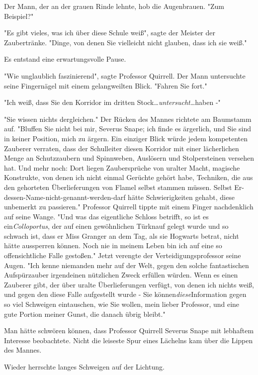{Der Mann, der an der grauen Rinde lehnte, hob die Augenbrauen. "Zum Beispiel?"

"Es gibt vieles, was ich über diese Schule weiß", sagte der Meister der Zaubertränke. "Dinge, von denen Sie vielleicht nicht glauben, dass ich sie weiß."

Es entstand eine erwartungsvolle Pause.

"Wie unglaublich faszinierend", sagte Professor Quirrell. Der Mann untersuchte seine Fingernägel mit einem gelangweilten Blick. "Fahren Sie fort."

"Ich weiß, dass Sie den Korridor im dritten Stock…\emph{untersucht…}haben -"

"Sie wissen nichts dergleichen." Der Rücken des Mannes richtete am Baumstamm auf. "Bluffen Sie nicht bei mir, Severus Snape; ich finde es ärgerlich, und Sie sind in keiner Position, mich zu ärgern. Ein einziger Blick würde jedem kompetenten Zauberer verraten, dass der Schulleiter diesen Korridor mit einer lächerlichen Menge an Schutzzaubern und Spinnweben, Auslösern und Stolpersteinen versehen hat. Und mehr noch: Dort liegen Zaubersprüche von uralter Macht, magische Konstrukte, von denen ich nicht einmal Gerüchte gehört habe, Techniken, die aus den gehorteten Überlieferungen von Flamel selbst stammen müssen. Selbst Er-dessen-Name-nicht-genannt-werden-darf hätte Schwierigkeiten gehabt, diese unbemerkt zu passieren." Professor Quirrell tippte mit einem Finger nachdenklich auf seine Wange. "Und was das eigentliche Schloss betrifft, so ist es ein\emph{Colloportus}, der auf einen gewöhnlichen Türknauf gelegt wurde und so schwach ist, dass er Miss Granger an dem Tag, als sie Hogwarts betrat, nicht hätte aussperren können. Noch nie in meinem Leben bin ich auf eine so offensichtliche Falle gestoßen." Jetzt verengte der Verteidigungsprofessor seine Augen. "Ich kenne niemanden mehr auf der Welt, gegen den solche fantastischen Aufspürzauber irgendeinen nützlichen Zweck erfüllen würden. Wenn es einen Zauberer gibt, der über uralte Überlieferungen verfügt, von denen ich nichts weiß, und gegen den diese Falle aufgestellt wurde - Sie können\emph{diese}Information gegen so viel Schweigen eintauschen, wie Sie wollen, mein lieber Professor, und eine gute Portion meiner Gunst, die danach übrig bleibt."

Man hätte schwören können, dass Professor Quirrell Severus Snape mit lebhaftem Interesse beobachtete. Nicht die leiseste Spur eines Lächelns kam über die Lippen des Mannes.

Wieder herrschte langes Schweigen auf der Lichtung.

}

